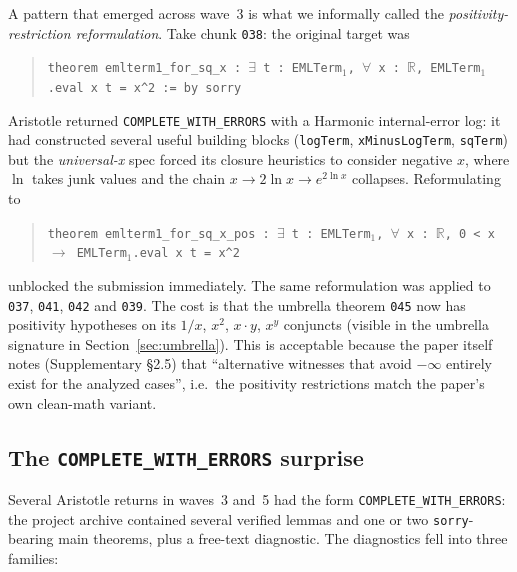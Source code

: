 \documentclass[11pt,a4paper]{article}
\theoremstyle{plain}
\theoremstyle{definition}
\newcommand{\R}{\mathbb{R}}
\begin{document}
A pattern that emerged across wave~3 is what we informally called the
\emph{positivity-restriction reformulation}.  Take chunk \texttt{038}:
the original target was
\begin{quote}
\texttt{theorem emlterm1\_for\_sq\_x : $\exists$ t : EMLTerm$_1$,
$\forall$ x : $\R$, EMLTerm$_1$.eval x t = x{\textasciicircum}2 := by
sorry}
\end{quote}
Aristotle returned \texttt{COMPLETE\_WITH\_ERRORS} with a Harmonic
internal-error log: it had constructed several useful building blocks
(\texttt{logTerm}, \texttt{xMinusLogTerm}, \texttt{sqTerm}) but the
\emph{universal-x} spec forced its closure heuristics to consider negative
$x$, where $\ln$ takes junk values and the chain $x\to 2\ln x\to e^{2\ln
x}$ collapses.  Reformulating to
\begin{quote}
\texttt{theorem emlterm1\_for\_sq\_x\_pos : $\exists$ t : EMLTerm$_1$,
$\forall$ x : $\R$, 0 < x $\to$ EMLTerm$_1$.eval x t = x{\textasciicircum}2}
\end{quote}
unblocked the submission immediately.  The same reformulation was
applied to \texttt{037}, \texttt{041}, \texttt{042} and \texttt{039}.
The cost is that the umbrella theorem \texttt{045} now has positivity
hypotheses on its $1/x$, $x^2$, $x{\cdot}y$, $x^y$ conjuncts (visible in
the umbrella signature in Section~\ref{sec:umbrella}).  This is acceptable
because the paper itself notes (Supplementary §2.5) that ``alternative
witnesses that avoid $-\infty$ entirely exist for the analyzed cases'',
i.e.~the positivity restrictions match the paper's own clean-math
variant.

\subsection{The \texttt{COMPLETE\_WITH\_ERRORS} surprise}

Several Aristotle returns in waves~3 and~5 had the form
\texttt{COMPLETE\_WITH\_ERRORS}: the project archive contained several
verified lemmas and one or two \texttt{sorry}-bearing main theorems,
plus a free-text diagnostic.  The diagnostics fell into three families:
\end{document}
